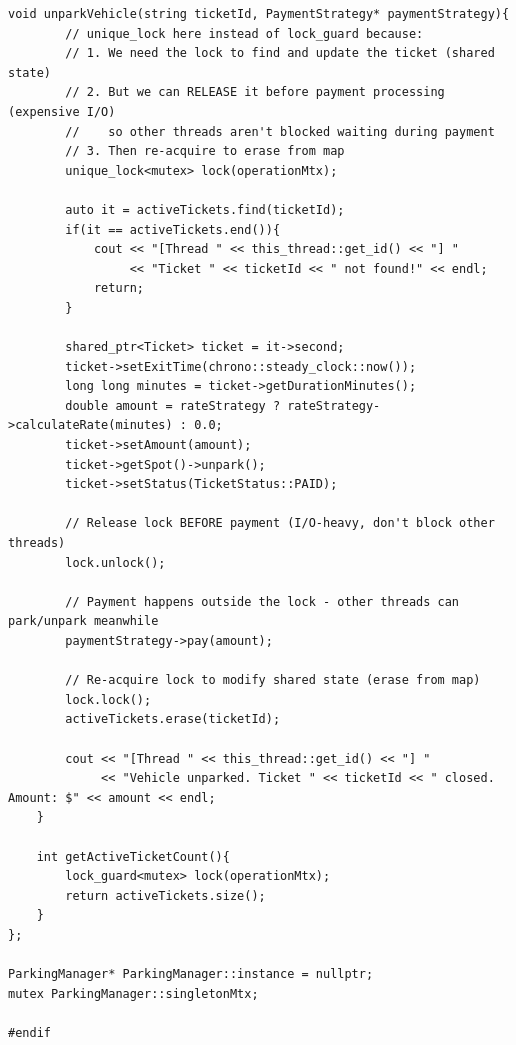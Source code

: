 \documentclass[11pt,a4paper]{article}
\begin{document}
\begin{lstlisting}[title={\texttt{managers.hpp}}]
    void unparkVehicle(string ticketId, PaymentStrategy* paymentStrategy){
        // unique_lock here instead of lock_guard because:
        // 1. We need the lock to find and update the ticket (shared state)
        // 2. But we can RELEASE it before payment processing (expensive I/O)
        //    so other threads aren't blocked waiting during payment
        // 3. Then re-acquire to erase from map
        unique_lock<mutex> lock(operationMtx);

        auto it = activeTickets.find(ticketId);
        if(it == activeTickets.end()){
            cout << "[Thread " << this_thread::get_id() << "] "
                 << "Ticket " << ticketId << " not found!" << endl;
            return;
        }

        shared_ptr<Ticket> ticket = it->second;
        ticket->setExitTime(chrono::steady_clock::now());
        long long minutes = ticket->getDurationMinutes();
        double amount = rateStrategy ? rateStrategy->calculateRate(minutes) : 0.0;
        ticket->setAmount(amount);
        ticket->getSpot()->unpark();
        ticket->setStatus(TicketStatus::PAID);

        // Release lock BEFORE payment (I/O-heavy, don't block other threads)
        lock.unlock();

        // Payment happens outside the lock - other threads can park/unpark meanwhile
        paymentStrategy->pay(amount);

        // Re-acquire lock to modify shared state (erase from map)
        lock.lock();
        activeTickets.erase(ticketId);

        cout << "[Thread " << this_thread::get_id() << "] "
             << "Vehicle unparked. Ticket " << ticketId << " closed. Amount: $" << amount << endl;
    }

    int getActiveTicketCount(){
        lock_guard<mutex> lock(operationMtx);
        return activeTickets.size();
    }
};

ParkingManager* ParkingManager::instance = nullptr;
mutex ParkingManager::singletonMtx;

#endif
\end{lstlisting}

\newpage
\end{document}
